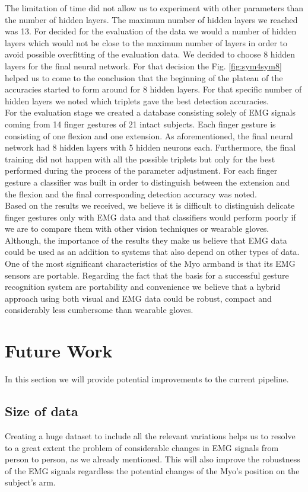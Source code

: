 The limitation of time did not allow us to experiment with other parameters than the number of hidden layers. The maximum number of hidden layers we reached was 13. For decided for the evaluation of the data we would a number of hidden layers which would not be close to the maximum number of layers in order to avoid possible overfitting of the evaluation data. We decided to choose  8 hidden layers for the final neural network. For that decision the Fig. \ref{fig:sym4sym8} helped us to come to the conclusion that the beginning of the plateau of the accuracies started to form around for 8 hidden layers. For that specific number of hidden layers we noted which triplets gave the best detection accuracies. \\
For the evaluation stage we created a database consisting solely of EMG signals coming from 14 finger gestures of 21 intact subjects. Each finger gesture is consisting of one flexion and one extension. As aforementioned,  the final neural network had 8 hidden layers with 5 hidden neurons each. Furthermore, the final training did not happen with all the possible triplets but only for the best performed during the process of the parameter adjustment.  For each finger gesture a classifier was built in order to distinguish between the extension and the flexion and the final corresponding detection accuracy was noted. \\
Based on the results we received, we believe it is difficult to distinguish delicate finger gestures only with EMG data and that classifiers would perform poorly if we are to compare them with other vision techniques or wearable gloves. Although, the importance of the results they make us believe that EMG data could be used as an addition to systems that also depend on other types of data. One of the most significant characteristics of the Myo armband is that its EMG sensors are portable. Regarding the fact that the basis for a successful gesture recognition system are portability and convenience we believe that a hybrid approach using both visual and EMG data could be robust, compact and considerably less cumbersome than wearable gloves.
\section{Future Work}
In this section we will provide potential improvements to the current pipeline.
\subsection{Size of data}
Creating a huge dataset to include all the relevant variations helps us to resolve to a great extent the problem of considerable changes in EMG signals from person to person, as we already mentioned. This will also improve the robustness of the EMG signals regardless the potential changes of the Myo's position on the subject's arm. 
